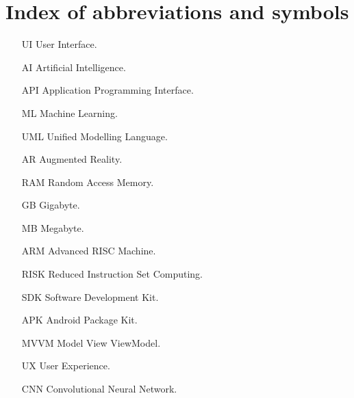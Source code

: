 
\chapter{Index of abbreviations and symbols}

\begin{itemize}
\item[UI] User Interface.
\item[AI] Artificial Intelligence.
\item[API] Application Programming Interface.
\item[ML] Machine Learning.
\item[UML] Unified Modelling Language.
\item[AR] Augmented Reality.
\item[RAM] Random Access Memory.
\item[GB] Gigabyte.
\item[MB] Megabyte.
\item[ARM] Advanced RISC Machine.
\item[RISK] Reduced Instruction Set Computing.
\item[SDK] Software Development Kit.
\item[APK] Android Package Kit.
\item[MVVM] Model View ViewModel.
\item[UX] User Experience.
\item[CNN] Convolutional Neural Network.
\end{itemize}
